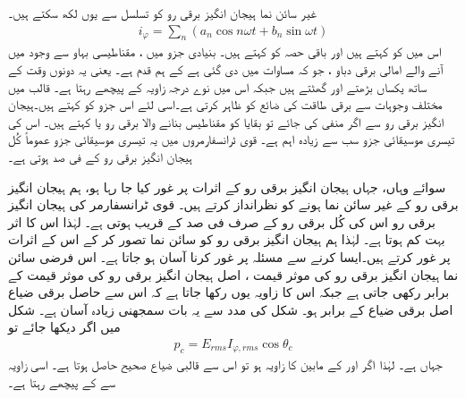 غیر سائن نما ہیجان انگیز برقی رو  کو  تسلسل سے یوں لکھ سکتے ہیں۔
\begin{align} 
i_{\varphi}=\sum_n {\left( a_n \cos n \omega t + b_n \sin \omega t \right)}
\end{align}
اس میں  کو  کہتے ہیں اور باقی حصہ کو    کہتے ہیں۔ بنیادی جزو میں ، مقناطیسی بہاو سے وجود میں آنے والے امالی برقی دباو  ،  جو کہ مساوات  میں دی گئی ہے کے ہم قدم ہے۔ یعنی  یہ دونوں وقت کے ساتھ یکساں بڑھتے اور گھٹتے ہیں جبکہ اس میں  نوے درجہ زاویہ   کے پیچھے رہتا ہے۔ قالب میں مختلف وجوہات سے برقی طاقت کی ضائع  کو  ظاہر  کرتی ہے۔اسی لئے اس جزو کو   کہتے ہیں۔ہیجان انگیز برقی رو  سے اگر  منفی کی جائے تو بقایا کو مقناطیس بنانے والا برقی رو یا  کہتے ہیں۔ اس  کی تیسری موسیقائی جزو سب سے زیادہ اہم  ہے۔ قوی  ٹرانسفارمروں میں یہ تیسری موسیقائی جزو عموماً  کُل ہیجان انگیز برقی رو  کے  فی صد ہوتی ہے۔  

سوائے وہاں، جہاں  ہیجان انگیز برقی رو کے اثرات پر غور کیا جا رہا ہو، ہم ہیجان انگیز برقی رو کے غیر سائن نما ہونے کو نظرانداز کرتے ہیں۔ قوی ٹرانسفارمر کی  ہیجان انگیز برقی رو اس کی کُل برقی رو کے صرف   فی صد کے قریب ہوتی ہے۔ لہٰذا  اس کا اثر بہت کم ہوتا ہے۔ لہٰذا ہم  ہیجان انگیز برقی رو کو سائن نما تصور کر کے اس کے اثرات پر غور کرتے ہیں۔ایسا کرنے سے مسئلہ پر غور کرنا آسان ہو جاتا ہے۔ اس فرضی سائن نما  ہیجان انگیز برقی رو   کی موثر قیمت  ، اصل  ہیجان انگیز برقی رو کی موثر قیمت کے برابر رکھی جاتی ہے جبکہ اس کا زاویہ  یوں رکھا جاتا ہے کہ اس سے حاصل برقی ضیاع اصل برقی ضیاع کے برابر ہو۔ شکل   کی مدد سے یہ بات سمجھنی زیادہ آسان ہے۔ شکل میں اگر دیکھا جائے تو
\begin{align}
p_c=E_{rms} I_{\varphi,rms} \cos \theta_c
\end{align}
جہاں    ہے۔ لہٰذا  اگر  اور  کے مابین  کا زاویہ ہو تو اس سے قالبی ضیاع صحیح حاصل ہوتا ہے۔ اسی زاویہ  سے    کے پیچھے رہتا ہے۔

